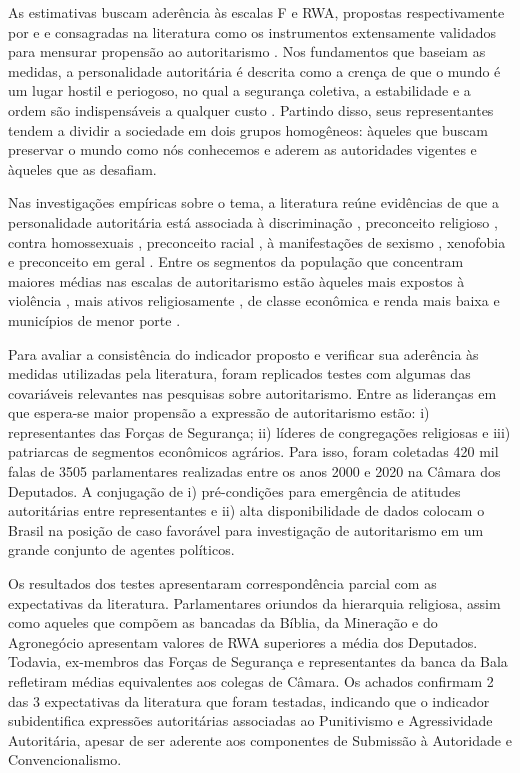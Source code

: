 \documentclass[
12pt,				%
openright,			%
twoside,			%
a4paper,			%
english,			%
french,				%
spanish,			%
brazil				%
]{abntex2}
\begin{document}
As estimativas buscam aderência às escalas F e RWA, propostas respectivamente por  e  e consagradas na literatura como os instrumentos extensamente validados para mensurar propensão ao autoritarismo \cite{titus1957california, meloen1993f}. Nos fundamentos que baseiam as medidas, a personalidade autoritária é descrita como a crença de que o mundo é um lugar hostil e periogoso, no qual a segurança coletiva, a estabilidade e a ordem são indispensáveis a qualquer custo \cite{altemeyer1996authoritarian}. Partindo disso, seus representantes tendem a dividir a sociedade em dois grupos homogêneos: àqueles que buscam preservar o mundo como nós conhecemos e aderem as autoridades vigentes e àqueles que as desafiam.

Nas investigações empíricas sobre o tema, a literatura reúne evidências de que a personalidade autoritária está associada à discriminação \cite{titus1957california, meloen1993f}, preconceito religioso \cite{laythe2001predicting}, contra homossexuais \cite{hunsberger1996religious, jonathan2008influence}, preconceito racial \cite{rowatt2004christian}, à manifestações de sexismo \cite{sibley2007antecedents}, xenofobia \cite{thomsen2008we} e preconceito em geral \cite{asbrock2010right}. Entre os segmentos da população que concentram maiores médias nas escalas de autoritarismo estão àqueles mais expostos à violência \cite{seligson2010crime, carreras2013impact, de2018analises}, mais ativos religiosamente \cite{rokeach1956political,johnson2011mediational, fuks2012atitudes}, de classe econômica e renda mais baixa e municípios de menor porte \cite{fbsp2017medo}.      

Para avaliar a consistência do indicador proposto e verificar sua aderência às medidas utilizadas pela literatura, foram replicados testes com algumas das covariáveis relevantes nas pesquisas sobre autoritarismo. Entre as lideranças em que espera-se maior propensão a expressão de autoritarismo estão: i) representantes das Forças de Segurança; ii) líderes de congregações religiosas e iii) patriarcas de segmentos econômicos agrários. Para isso, foram coletadas 420 mil falas de 3505 parlamentares realizadas entre os anos 2000 e 2020 na Câmara dos Deputados. A conjugação de i) pré-condições para emergência de atitudes autoritárias entre representantes e ii) alta disponibilidade de dados colocam o Brasil na posição de caso favorável para investigação de autoritarismo em um grande conjunto de agentes políticos. 

Os resultados dos testes apresentaram correspondência parcial com as expectativas da literatura. Parlamentares oriundos da hierarquia religiosa, assim como aqueles que compõem as bancadas da Bíblia, da Mineração e do Agronegócio apresentam valores de RWA superiores a média dos Deputados. Todavia, ex-membros das Forças de Segurança e representantes da banca da Bala refletiram médias equivalentes aos colegas de Câmara. Os achados confirmam 2 das 3 expectativas da literatura que foram testadas, indicando que o indicador subidentifica expressões autoritárias associadas ao Punitivismo e Agressividade Autoritária, apesar de ser aderente aos componentes de Submissão à Autoridade e Convencionalismo. 
\end{document}
